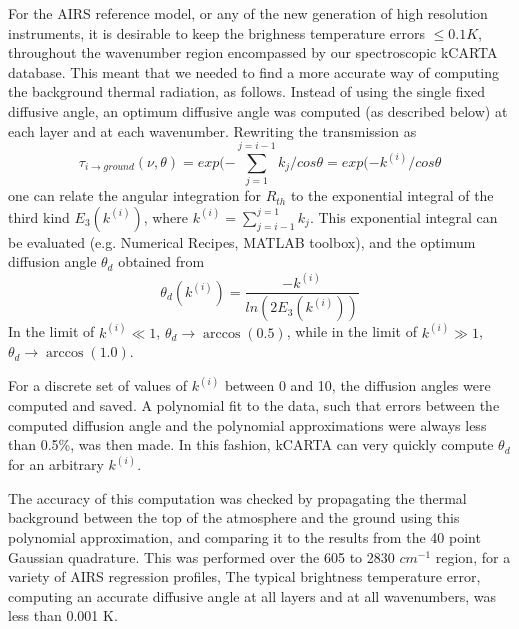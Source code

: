 \documentclass[11pt]{article}
\begin{document}
For the \textsf{AIRS} reference model, or any of the new generation of high 
resolution instruments, it is desirable to keep the brighness temperature 
errors $\le 0.1K$, throughout the wavenumber region encompassed by our 
spectroscopic \textsf{kCARTA} database. This meant that we needed to find a 
more accurate way of computing the background thermal radiation, as follows.
Instead of using the single fixed diffusive angle, an optimum diffusive 
angle was computed (as described below) at each layer and at each wavenumber. 
Rewriting the transmission as 
\[
\tau_{i \rightarrow ground}(\nu,\theta) = 
exp(-\sum_{j=1}^{j=i-1}k_{j}/cos\theta = exp(-k^{(i)}/cos\theta
\]
one can relate the angular integration for $R_{th}$ to the exponential 
integral of the third kind $E_{3}(k^{(i)})$, where 
$k^{(i)} = \sum_{j=i-1}^{j=1}k_{j}$.  This exponential integral can be 
evaluated (e.g. Numerical Recipes, MATLAB toolbox), and the optimum 
diffusion angle $\theta_{d}$ obtained from
\begin{equation}
         \theta_{d}(k^{(i)}) = \frac{- k^{(i)}}{ln (2 E_{3}(k^{(i)}))}
\end{equation}
In the limit
of $k^{(i)} \ll 1$, $\theta_{d} \rightarrow \arccos(0.5)$, while in the limit
of $k^{(i)} \gg 1$, $\theta_{d} \rightarrow \arccos(1.0)$. 

For a discrete set of values of $k^{(i)}$ between 0 and 10, the
diffusion angles were computed and saved. A polynomial fit to the
data, such that errors between the computed diffusion angle and the
polynomial approximations were always less than 0.5\%, was then made.
In this fashion, \textsf{kCARTA} can very quickly compute $\theta_{d}$
for an arbitrary $k^{(i)}$.

The accuracy of this computation was checked by propagating the
thermal background between the top of the atmosphere and the ground
using this polynomial approximation, and comparing it to the results
from the 40 point Gaussian quadrature. This was performed over the 605
to 2830 $cm^{-1}$ region, for a variety of AIRS regression profiles,
The typical brightness temperature error, computing an accurate diffusive 
angle at all layers and at all wavenumbers, was less than 0.001 K.
\end{document}

